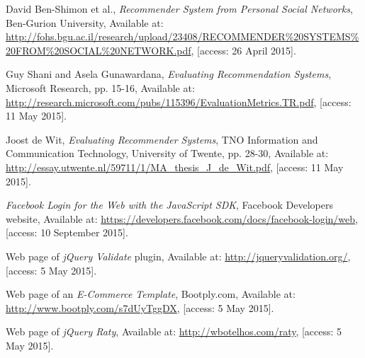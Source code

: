 \documentclass[12pt]{report}
\begin{document}
\begin{thebibliography}{99}
David Ben-Shimon et al., \textit{Recommender System from Personal Social Networks}, Ben-Gurion University, Available at: \url{http://fohs.bgu.ac.il/research/upload/23408/RECOMMENDER%20SYSTEMS%20FROM%20SOCIAL%20NETWORK.pdf}, [access: 26 April 2015].

Guy Shani and Asela Gunawardana, \textit{Evaluating Recommendation Systems}, Microsoft Research, pp. 15-16, Available at: \url{http://research.microsoft.com/pubs/115396/EvaluationMetrics.TR.pdf}, [access: 11 May 2015].

Joost de Wit, \textit{Evaluating Recommender Systems}, TNO Information and Communication Technology, University of Twente, pp. 28-30, Available at: \url{http://essay.utwente.nl/59711/1/MA_thesis_J_de_Wit.pdf}, [access: 11 May 2015].

\textit{Facebook Login for the Web with the JavaScript SDK}, Facebook Developers website, Available at: \url{https://developers.facebook.com/docs/facebook-login/web}, [access: 10 September 2015].

Web page of \textit{jQuery Validate} plugin, Available at: \url{http://jqueryvalidation.org/}, [access: 5 May 2015].

Web page of an \textit{E-Commerce Template}, Bootply.com, Available at: \url{http://www.bootply.com/s7dUyTggDX}, [access: 5 May 2015].

Web page of \textit{jQuery Raty}, Available at: \url{http://wbotelhos.com/raty}, [access: 5 May 2015].

\end{thebibliography}

\listoffigures

\listoftables
\end{document}
